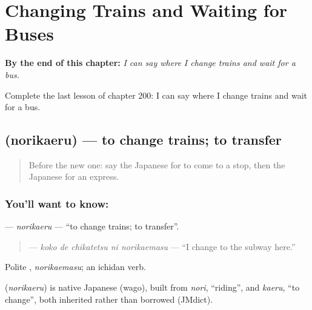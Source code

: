 
\chapter{Changing Trains and Waiting for Buses}
\label{ch:ja-changing-trains-and-waiting-for-buses}

\begin{chapteropening}
\textbf{By the end of this chapter:} \emph{I can say where I change trains and wait for a bus.}

Complete the last lesson of chapter 200: I can say where I change trains and wait for a bus.
\end{chapteropening}

\section[\texorpdfstring{\ja{のりかえる} (norikaeru)}{のりかえる (norikaeru)}]{ (norikaeru) — to change trains; to transfer}

\label{lesson:JA-C200-norikaeru}



\begin{quote}
Before the new one: say the Japanese for to come to a stop, then the Japanese for an express.
\end{quote}

\subsection*{You'll want to know: }
\textbf{} — \emph{norikaeru} — \textquotedblleft{}to change trains; to transfer\textquotedblright{}.

\begin{quote}
\textbf{  } — \emph{koko de chikatetsu ni norikaemasu} — \textquotedblleft{}I change to the subway here.\textquotedblright{}
\end{quote}

Polite \textbf{}, \emph{norikaemasu}; an ichidan verb.

\begin{cousinweb}
\textbf{} (\emph{norikaeru}) is native Japanese (wago), built from \emph{nori}, \textquotedblleft{}riding\textquotedblright{}, and \emph{kaeru}, \textquotedblleft{}to change\textquotedblright{}, both inherited rather than borrowed (JMdict).
\end{cousinweb}


